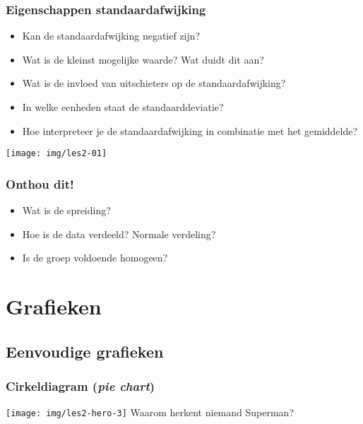 \documentclass[aspectratio=169]{beamer}
\begin{document}
\begin{frame}
  \frametitle{Eigenschappen standaardafwijking}

  \begin{itemize}
    \item<+-> Kan de standaardafwijking negatief zijn?
    \item<+-> Wat is de kleinst mogelijke waarde? Wat duidt dit aan?
    \item<+-> Wat is de invloed van uitschieters op de standaardafwijking?
    \item<+-> In welke eenheden staat de standaarddeviatie?
    \item<+-> Hoe interpreteer je de standaardafwijking in combinatie met het gemiddelde?
  \end{itemize}
\end{frame}

\begin{frame}[plain]

  \texttt{[image: img/les2-01]}
\end{frame}

\begin{frame}
  \frametitle{Onthou dit!}
  
  
  \begin{itemize}
    \item Wat is de spreiding?
    \item Hoe is de data verdeeld? Normale verdeling?
    \item Is de groep voldoende homogeen?
  \end{itemize}
\end{frame}

\section{Grafieken}

\subsection{Eenvoudige grafieken}

\begin{frame}
  \frametitle{Cirkeldiagram (\emph{pie chart})}

  \centering
  \texttt{[image: img/les2-hero-3]}
  Waarom herkent niemand Superman?

\end{frame}
\end{document}
